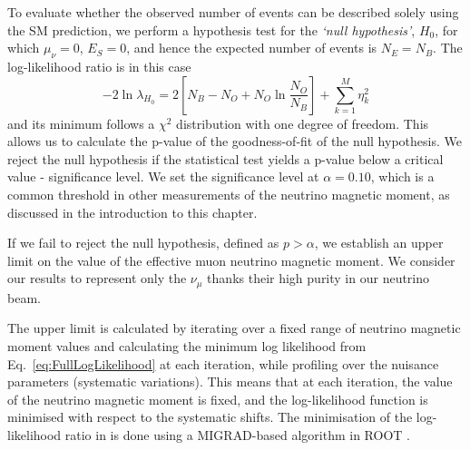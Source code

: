 To evaluate whether the observed number of events can be described solely using the \gls{SM} prediction, we perform a hypothesis test for the \textit{`null hypothesis'}, $H_0$, for which $\mu_\nu=0$, $E_S=0$, and hence the expected number of events is $N_E=N_B$. The log-likelihood ratio is in this case
\begin{equation}\label{eq:NullHypothesisLogLikelihood}
-2\ln\lambda_{H_0}=
2\left[N_B-N_O+N_O\ln\frac{N_O}{N_B}\right] + \sum_{k=1}^M \eta_k^2
\end{equation}
and its minimum follows a $\chi^2$ distribution with one degree of freedom. This allows us to calculate the p-value of the goodness-of-fit of the null hypothesis. We reject the null hypothesis if the statistical test yields a p-value below a critical value - significance level. We set the significance level at $\alpha=0.10$, which is a common threshold in other measurements of the neutrino magnetic moment, as discussed in the introduction to this chapter.


If we fail to reject the null hypothesis, defined as $p>\alpha$, we establish an upper limit on the value of the effective muon neutrino magnetic moment. We consider our results to represent only the $\nu_\mu$ thanks their high purity in our neutrino beam.

The upper limit is calculated by iterating over a fixed range of neutrino magnetic moment values and calculating the minimum log likelihood from Eq.~\ref{eq:FullLogLikelihood} at each iteration, while profiling over the nuisance parameters (systematic variations). This means that at each iteration, the value of the neutrino magnetic moment is fixed, and the log-likelihood function is minimised with respect to the systematic shifts. The minimisation of the log-likelihood ratio in  is done using a MIGRAD-based algorithm in ROOT \cite{ROOT}.

